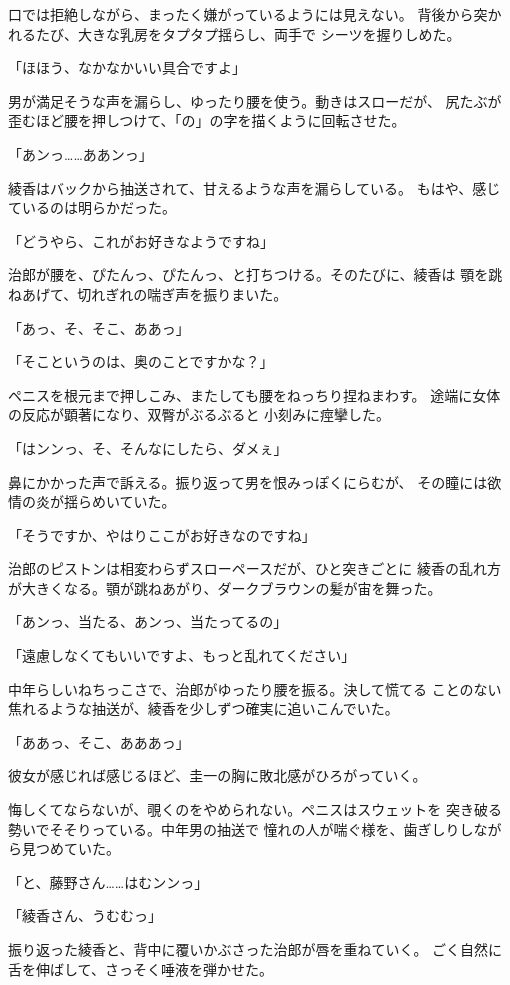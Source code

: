 ﻿\documentclass[
    book,tate,
    line_length=30zw,
    jafontsize=12pt,
    paper=b5j,
    landscape,
    ]{jlreq}
\begin{document}
口では拒絶しながら、まったく嫌がっているようには見えない。
背後から突かれるたび、大きな乳房をタプタプ揺らし、両手で
シーツを握りしめた。

「ほほう、なかなかいい具合ですよ」

男が満足そうな声を漏らし、ゆったり腰を使う。動きはスローだが、
尻たぶが歪むほど腰を押しつけて、「の」の字を描くように回転させた。

「あンっ……ああンっ」

綾香はバックから抽送されて、甘えるような声を漏らしている。
もはや、感じているのは明らかだった。

「どうやら、これがお好きなようですね」

治郎が腰を、ぴたんっ、ぴたんっ、と打ちつける。そのたびに、綾香は
顎を跳ねあげて、切れぎれの喘ぎ声を振りまいた。

「あっ、そ、そこ、ああっ」

「そこというのは、奥のことですかな？」

ペニスを根元まで押しこみ、またしても腰をねっちり捏ねまわす。
途端に女体の反応が顕著になり、双臀がぶるぶると 小刻みに痙攣した。

「はンンっ、そ、そんなにしたら、ダメぇ」

鼻にかかった声で訴える。振り返って男を恨みっぽくにらむが、
その瞳には欲情の炎が揺らめいていた。

「そうですか、やはりここがお好きなのですね」

治郎のピストンは相変わらずスローペースだが、ひと突きごとに
綾香の乱れ方が大きくなる。顎が跳ねあがり、ダークブラウンの髪が宙を舞った。

「あンっ、当たる、あンっ、当たってるの」

「遠慮しなくてもいいですよ、もっと乱れてください」

中年らしいねちっこさで、治郎がゆったり腰を振る。決して慌てる
ことのない焦れるような抽送が、綾香を少しずつ確実に追いこんでいた。

「ああっ、そこ、あああっ」

彼女が感じれば感じるほど、圭一の胸に敗北感がひろがっていく。

悔しくてならないが、覗くのをやめられない。ペニスはスウェットを
突き破る勢いでそそりっている。中年男の抽送で
憧れの人が喘ぐ様を、歯ぎしりしながら見つめていた。

「と、藤野さん……はむンンっ」

「綾香さん、うむむっ」

振り返った綾香と、背中に覆いかぶさった治郎が唇を重ねていく。
ごく自然に舌を伸ばして、さっそく唾液を弾かせた。
\end{document}
